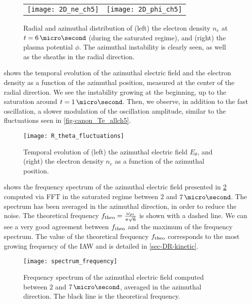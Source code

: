   \begin{figure}[hbtp]
    \centering
    \begin{tabular}{@{} c c}
      \texttt{[image: 2D\_ne\_ch5]} &
      \texttt{[image: 2D\_phi\_ch5]} \\
    \end{tabular}
    \caption{Radial and azimuthal distribution of (left) the electron density $n_e$ at $t=6\,\micro\second$ (during the saturated regime), and (right) the plasma potential $\phi$. The azimuthal instability is clearly seen, as well as the sheaths in the radial direction. }
    \label{fig-2D_ne}
  \end{figure}
  
   shows the temporal evolution of the azimuthal electric field and the electron density as a function of the azimuthal position, measured at the center of the radial direction.
  We see the instability growing at the beginning, up to the saturation around $t=1\,\micro\second$.
  Then, we observe, in addition to the fast oscillation, a slower modulation of the oscillation amplitude, similar to the fluctuations seen in \cref{fig-canon_Te_allch5}.
  \begin{figure}[!hbt]
    \centering
    \texttt{[image: R\_theta\_fluctuations]}
    \caption{Temporal evolution of (left) the azimuthal electric field $E_{\theta}$, and (right) the electron density $n_e$ as a function of the azimuthal position.}
    \label{fig-2DcutEx}
  \end{figure}

   shows the frequency spectrum of the azimuthal electric field presented in \cref{fig-2DcutEx} computed via \ac{FFT} in the saturated regime between $2$ and $7\,\micro\second$.
  The spectrum has been averaged in the azimuthal direction, in order to reduce the noise.
  The theoretical frequency $f_{\rm theo} = \frac{\omega_{pi}}{\pi \sqrt{6} }$ \citep{croes2018} is shown with a dashed line. 
  We can see a very good agreement between $f_{\rm theo}$ and the maximum of the frequency spectrum.
  The value of the theoretical frequency $f_{\rm theo}$ corresponds to the most growing frequency of the \ac{IAW} and is detailed in \cref{sec-DR-kinetic}.
  \begin{figure}[!hbt]
    \centering
    \texttt{[image: spectrum\_frequency]}
    \caption{Frequency spectrum of the azimuthal electric field computed between $2$ and $7\,\micro\second$, averaged in the azimuthal direction. The black line is the theoretical frequency.}
    \label{fig-FFT_ex}
  \end{figure}
  
